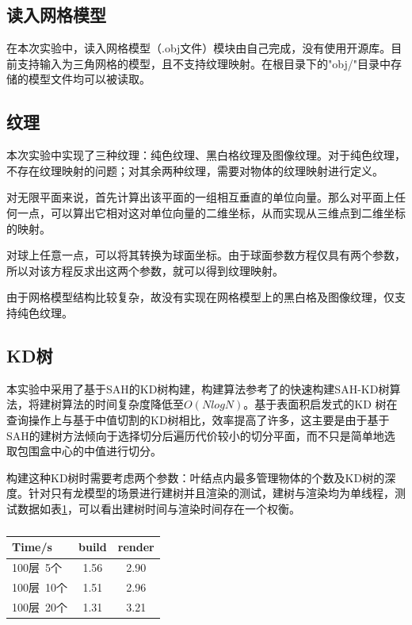 \subsection {读入网格模型}
在本次实验中，读入网格模型（.obj文件）模块由自己完成，没有使用开源库。目前支持输入为三角网格的模型，且不支持纹理映射。在根目录下的"obj/"目录中存储的模型文件均可以被读取。

\subsection {纹理}
本次实验中实现了三种纹理：纯色纹理、黑白格纹理及图像纹理。对于纯色纹理，不存在纹理映射的问题；对其余两种纹理，需要对物体的纹理映射进行定义。

对无限平面来说，首先计算出该平面的一组相互垂直的单位向量。那么对平面上任何一点，可以算出它相对这对单位向量的二维坐标，从而实现从三维点到二维坐标的映射。

对球上任意一点，可以将其转换为球面坐标。由于球面参数方程仅具有两个参数，所以对该方程反求出这两个参数，就可以得到纹理映射。

由于网格模型结构比较复杂，故没有实现在网格模型上的黑白格及图像纹理，仅支持纯色纹理。

\subsection {KD树}
本实验中采用了基于SAH的KD树构建，构建算法参考了\cite{wald2006building}的快速构建SAH-KD树算法，将建树算法的时间复杂度降低至$O(NlogN)$。基于表面积启发式的KD 树在查询操作上与基于中值切割的KD树相比，效率提高了许多，这主要是由于基于SAH的建树方法倾向于选择切分后遍历代价较小的切分平面，而不只是简单地选取包围盒中心的中值进行切分。

构建这种KD树时需要考虑两个参数：叶结点内最多管理物体的个数及KD树的深度。针对只有龙模型的场景进行建树并且渲染的测试，建树与渲染均为单线程，测试数据如表\ref{table:kdtree_manage}，可以看出建树时间与渲染时间存在一个权衡。\\
\begin{table}
    \centering
    \begin{tabular}{l c c}
    Time/s & build & render\\
    \hline
    100层\ 5个 & 1.56 & 2.90\\
    100层\ 10个 & 1.51 & 2.96\\
    100层\ 20个 & 1.31 & 3.21\\
    \end{tabular}
    \caption{}
    \label{table:kdtree_manage}
\end{table}

